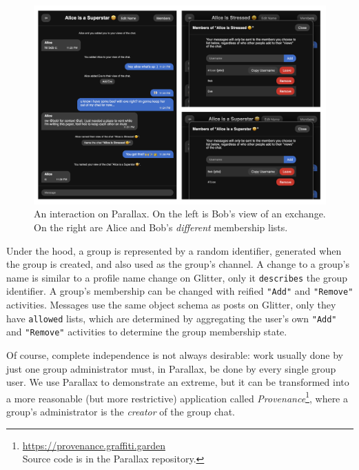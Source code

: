 \begin{figure}[h]
    \centering
    \includegraphics[width=\textwidth]{paper/figures/parallax.png}
    \caption{An interaction on Parallax. On the left is Bob's view of an exchange. On the right are Alice and Bob's \emph{different} membership lists.}

    \label{case-studies:fig:parallax}
\end{figure}

Under the hood, a group is represented by a random identifier,
generated when the group is created, and also used as the group's channel.
A change to a group's name is similar to a profile name change on Glitter, only it
\texttt{describes} the group identifier.
A group's membership can be changed with reified \texttt{"Add"}
and \texttt{"Remove"} activities.
Messages use the same object schema as posts on Glitter,
only they have \texttt{allowed} lists, which are determined
by aggregating the user's own \texttt{"Add"} and \texttt{"Remove"} activities
to determine the group membership state.

Of course, complete independence is not always desirable:
work usually done by just one group administrator must, in Parallax,
be done by every single group user.
We use Parallax to demonstrate an extreme,
but it can be
transformed into a more reasonable (but more restrictive) application called \emph{Provenance}\footnote{
\url{https://provenance.graffiti.garden}\\Source code is in the Parallax repository.
},
where a group's administrator is the  \emph{creator} of the group chat.

